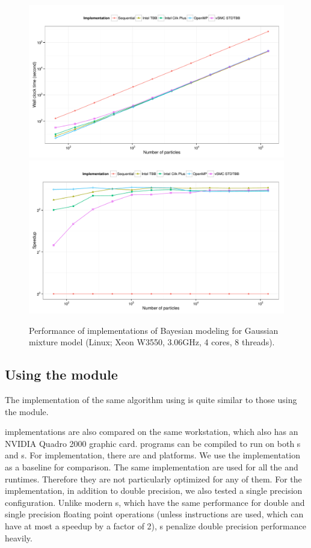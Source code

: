 \begin{figure}
  \centering
  \includegraphics[width=\linewidth]{fig/bench-smp-time-running}
  \includegraphics[width=\linewidth]{fig/bench-smp-speedup-running}
  \caption{Performance of \cpp implementations of Bayesian modeling for
    Gaussian mixture model (Linux; Xeon W3550, 3.06GHz, 4 cores, 8 threads).}
  \label{fig:bench-smp-perf}
\end{figure}

\subsection{Using the \protect\opencl module}
\label{sub:Using the OpenCL module}

The implementation of the same algorithm using \opencl is quite similar to
those using the \smp module.

\opencl implementations are also compared on the same workstation, which also
has an NVIDIA Quadro 2000 graphic card. \opencl programs can be compiled to
run on both \cpu{}s and \gpu{}s. For \cpu implementation, there are \iocl and
\aocl platforms. We use the \tbb implementation as a baseline for comparison.
The same \opencl implementation are used for all the \cpu and \gpu runtimes.
Therefore they are not particularly optimized for any of them. For the \gpu
implementation, in addition to double precision, we also tested a single
precision configuration. Unlike modern \cpu{}s, which have the same
performance for double and single precision floating point operations (unless
\simd instructions are used, which can have at most a speedup by a factor of
2), \gpu{}s penalize double precision performance heavily.

